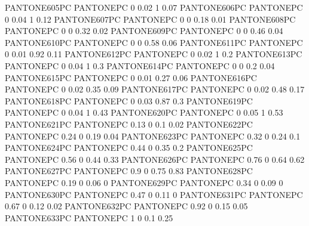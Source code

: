  {PANTONE605PC} {PANTONE\SpotSpace PC} {0 0.02 1 0.07}
 {PANTONE606PC} {PANTONE\SpotSpace PC} {0 0.04 1 0.12}
 {PANTONE607PC} {PANTONE\SpotSpace PC} {0 0 0.18 0.01}
 {PANTONE608PC} {PANTONE\SpotSpace PC} {0 0 0.32 0.02}
 {PANTONE609PC} {PANTONE\SpotSpace PC} {0 0 0.46 0.04}
 {PANTONE610PC} {PANTONE\SpotSpace PC} {0 0 0.58 0.06}
 {PANTONE611PC} {PANTONE\SpotSpace PC} {0 0.01 0.92 0.11}
 {PANTONE612PC} {PANTONE\SpotSpace PC} {0 0.02 1 0.2}
 {PANTONE613PC} {PANTONE\SpotSpace PC} {0 0.04 1 0.3}
 {PANTONE614PC} {PANTONE\SpotSpace PC} {0 0 0.2 0.04}
 {PANTONE615PC} {PANTONE\SpotSpace PC} {0 0.01 0.27 0.06}
 {PANTONE616PC} {PANTONE\SpotSpace PC} {0 0.02 0.35 0.09}
 {PANTONE617PC} {PANTONE\SpotSpace PC} {0 0.02 0.48 0.17}
 {PANTONE618PC} {PANTONE\SpotSpace PC} {0 0.03 0.87 0.3}
 {PANTONE619PC} {PANTONE\SpotSpace PC} {0 0.04 1 0.43}
 {PANTONE620PC} {PANTONE\SpotSpace PC} {0 0.05 1 0.53}
 {PANTONE621PC} {PANTONE\SpotSpace PC} {0.13 0 0.1 0.02}
 {PANTONE622PC} {PANTONE\SpotSpace PC} {0.24 0 0.19 0.04}
 {PANTONE623PC} {PANTONE\SpotSpace PC} {0.32 0 0.24 0.1}
 {PANTONE624PC} {PANTONE\SpotSpace PC} {0.44 0 0.35 0.2}
 {PANTONE625PC} {PANTONE\SpotSpace PC} {0.56 0 0.44 0.33}
 {PANTONE626PC} {PANTONE\SpotSpace PC} {0.76 0 0.64 0.62}
 {PANTONE627PC} {PANTONE\SpotSpace PC} {0.9 0 0.75 0.83}
 {PANTONE628PC} {PANTONE\SpotSpace PC} {0.19 0 0.06 0}
 {PANTONE629PC} {PANTONE\SpotSpace PC} {0.34 0 0.09 0}
 {PANTONE630PC} {PANTONE\SpotSpace PC} {0.47 0 0.11 0}
 {PANTONE631PC} {PANTONE\SpotSpace PC} {0.67 0 0.12 0.02}
 {PANTONE632PC} {PANTONE\SpotSpace PC} {0.92 0 0.15 0.05}
 {PANTONE633PC} {PANTONE\SpotSpace PC} {1 0 0.1 0.25}

